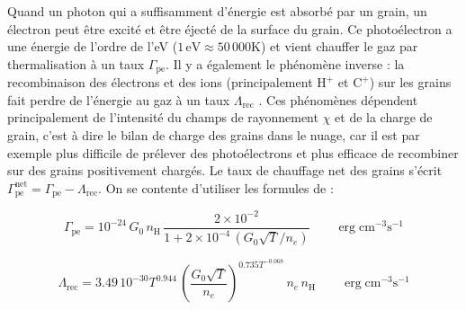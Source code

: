 Quand un photon qui a suffisamment d'énergie est absorbé par un grain, un électron peut être excité et être éjecté de la surface du grain. Ce photoélectron a une énergie de l'ordre de l'eV ($1\,\mathrm{eV}\approx 50\,000$K) et vient chauffer le gaz par thermalisation à un taux $\Gamma_{\mathrm{pe}}$. Il y a également le phénomène inverse : la recombinaison des électrons et des ions (principalement $\mathrm{H}^+$ et $\mathrm{C}^+$) sur les grains fait perdre de l'énergie au gaz à un taux $\Lambda_{\mathrm{rec}}$ \cite{Lequeux}. Ces phénomènes dépendent principalement de l'intensité du champs de rayonnement $\chi$ et de la charge de grain, c'est à dire le bilan de charge des grains dans le nuage, car il est par exemple plus difficile de prélever des photoélectrons et plus efficace de recombiner sur des grains positivement chargés. Le taux de chauffage net des grains s'écrit $\Gamma^{\mathrm{net}}_{\mathrm{pe}} = \Gamma_{\mathrm{pe}} - \Lambda_{\mathrm{rec}}$. On se contente d'utiliser les formules de \cite{BakesTielens1994} :

\begin{equation}
    \Gamma_{\mathrm{pe}} = 10^{-24}\,G_0\,n_\mathrm{H}\, \frac{2\times 10^{-2}}{1 + 2\times 10^{-4}\,(G_0 \sqrt{T}/n_e)} \qquad \operatorname{erg} \mathrm{cm}^{-3} \mathrm{s}^{-1}
    \label{eq:Rollig:pe}
\end{equation}

\begin{equation}
    \Lambda_{\mathrm{rec}} = 3.49\,10^{-30} T^{0.944} \, (\frac{G_0 \sqrt{T}}{n_e})^{0.735 T^{-0.068}} \, n_e \, n_\mathrm{H} \qquad \operatorname{erg} \mathrm{cm}^{-3} \mathrm{s}^{-1}
    \label{eq:Rollig:rece}
\end{equation}

